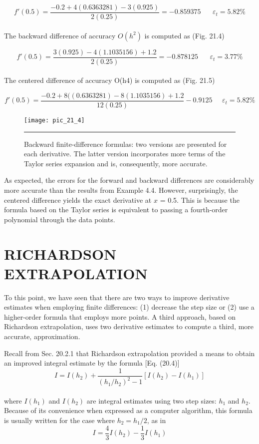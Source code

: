 \documentclass[../main.tex]{subfiles}
\begin{document}
	$$f'(0.5) = \dfrac{-0.2 + 4(0.6363281) -3(0.925) }{ 2(0.25)} = - 0.859375 \; \; \; \; \; \; \varepsilon_{t}=5.82\%$$\\
The backward difference of accuracy $O(h^{2})$ is computed as (Fig. 21.4)

	$$f'(0.5) = \dfrac{3(0.925) - 4(1.1035156) + 1.2}{2(0.25)} = -0.878125 \; \; \; \; \; \; \varepsilon_{t} = 3.77\%$$\\
The centered difference of accuracy O(h4) is computed as (Fig. 21.5)

	$$f'(0.5) = \dfrac{-0.2 + 8((0.6363281) -  8(1.1035156) + 1.2}{12(0.25)} -0.9125 \; \; \; \; \; \varepsilon_{t} = 5.82\%$$
	
\begin{figure}[hbt!]
	\centering
	\texttt{[image: pic\_21\_4]}
	\caption{\textsf{Backward finite-difference formulas: two versions are presented for each derivative. The latter
version incorporates more terms of the Taylor series expansion and is, consequently, more accurate.}} \hrule
	\label{pic.21.4}
\end{figure}

\vspace{0.2in}

As expected, the errors for the forward and backward differences are considerably
more accurate than the results from Example 4.4. However, surprisingly, the centered difference yields the exact derivative at $x$ = 0.5. This is because the formula based on the
Taylor series is equivalent to passing a fourth-order polynomial through the data points.

\section{RICHARDSON EXTRAPOLATION}
To this point, we have seen that there are two ways to improve derivative estimates when
employing finite differences: (1) decrease the step size or (2) use a higher-order formula
that employs more points. A third approach, based on Richardson extrapolation, uses two
derivative estimates to compute a third, more accurate, approximation.

Recall from Sec. 20.2.1 that Richardson extrapolation provided a means to obtain an
improved integral estimate by the formula [Eq. (20.4)]
\begin{equation}
	\tag{21.18}
	I = I(h_{2}) + \dfrac{1}{(h_{1}/h_{2})^{2} -1} [I(h_{2}) - I(h_{1})]
\end{equation}\\
where $I(h_{1})$ and $I(h_{2})$ are integral estimates using two step sizes: $h_{1}$ and $h_{2}$. Because of
its convenience when expressed as a computer algorithm, this formula is usually written
for the case where $h_{2} = h_{1}/2$, as in
\begin{equation}
	\tag{21.19}
	I=\dfrac{4}{3}I(h_{2}) - \dfrac{1}{3}I(h_{1})
\end{equation}
\end{document}
